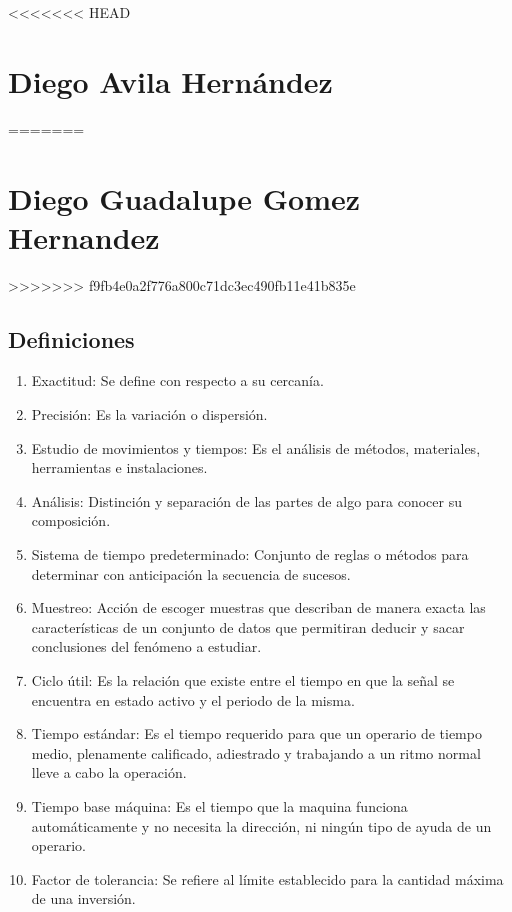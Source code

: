 <<<<<<< HEAD
\section{Diego Avila Hernández}
=======
\section{Diego Guadalupe Gomez Hernandez}
>>>>>>> f9fb4e0a2f776a800c71dc3ec490fb11e41b835e
\subsection{Definiciones}

\begin{enumerate}
    \item Exactitud: Se define con respecto a su cercanía.
    \item Precisión: Es la variación o dispersión.
    \item Estudio de movimientos y tiempos: Es el análisis de métodos, materiales, herramientas e instalaciones.
    \item Análisis: Distinción y separación de las partes de algo para conocer su composición.
    \item Sistema de tiempo predeterminado: Conjunto de reglas o métodos para determinar con anticipación la secuencia de sucesos.
    \item Muestreo: Acción de escoger muestras que describan de manera exacta las características de un conjunto de datos que permitiran deducir y sacar conclusiones del fenómeno a estudiar.
    \item Ciclo útil: Es la relación que existe entre el tiempo en que la señal se encuentra en estado activo y el periodo de la misma.
    \item Tiempo estándar: Es el tiempo requerido para que un operario de tiempo medio, plenamente calificado, adiestrado y trabajando a un ritmo normal lleve a cabo la operación.
    \item Tiempo base máquina: Es el tiempo que la maquina funciona automáticamente y no necesita la dirección, ni ningún tipo de ayuda de un operario.
    \item Factor de tolerancia: Se refiere al límite establecido para la cantidad máxima de una inversión.
    
    
\end{enumerate}